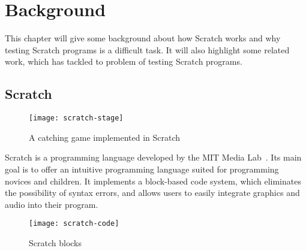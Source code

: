 
\chapter{Background}%
\label{cha:background}

This chapter will give some background about how Scratch works and why testing Scratch programs is a difficult task.
It will also highlight some related work, which has tackled to problem of testing Scratch programs.

\section{Scratch}%
\label{sec:scratch}

\begin{wrapfigure}{r}{0.35\textwidth + 5mm}
    \vspace{-3mm}
    \centering
    \texttt{[image: scratch-stage]}
    \caption{A catching game implemented in Scratch}
    \label{fig:a_catching_game_implemented_in_scratch}
    \vspace{-3mm}
\end{wrapfigure}

Scratch is a programming language developed by the MIT Media Lab~\cite{scratch}.
Its main goal is to offer an intuitive programming language suited for programming novices and children.
It implements a block-based code system, which eliminates the possibility of syntax errors,
and allows users to easily integrate graphics and audio into their program.

\begin{wrapfigure}{r}{0.45\textwidth + 5mm}
    \vspace{-3mm}
    \centering
    \texttt{[image: scratch-code]}
    \caption{Scratch blocks}
    \label{fig:scratch_blocks}
    \vspace{-3mm}
\end{wrapfigure}

